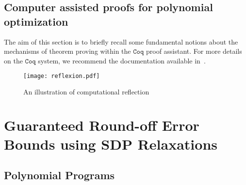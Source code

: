 \documentclass[a4paper,10pt]{article}
\newcommand{\coq}{\mathtt{Coq}}
\theoremstyle{plain}
\theoremstyle{definition}
\theoremstyle{remark}
\begin{document}
\subsection{Computer assisted proofs for polynomial optimization}
\label{sec:coqbackground}
The aim of this section is to briefly recall some fundamental notions
about the mechanisms of theorem proving within the $\coq$ proof
assistant. For more details on the $\coq$ system, we recommend the
documentation available in~\cite{bertot2004interactive}.


\begin{figure}[!ht]
\centering
\texttt{[image: reflexion.pdf]}
\caption{An illustration of computational reflection}	
\label{fig:reflexion}
\end{figure}

\section{Guaranteed Round-off Error Bounds using SDP Relaxations}
\label{sec:fpsdp}

\subsection{Polynomial Programs}
\end{document}
